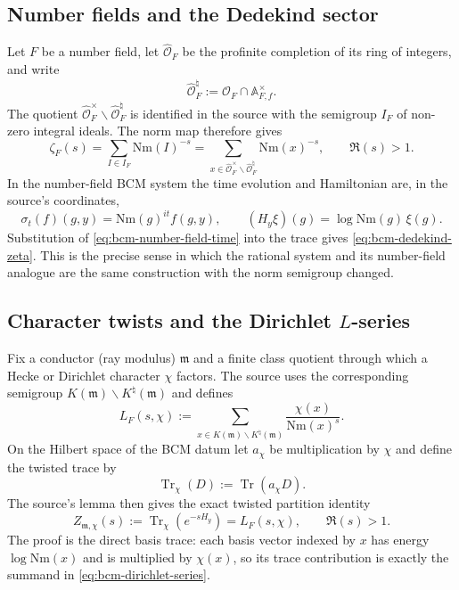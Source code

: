 \subsection{Number fields and the Dedekind sector}

Let $F$ be a number field, let $\widehat{\mathcal O}_F$ be the profinite
completion of its ring of integers, and write
\[
 \widehat{\mathcal O}_F^{\natural}
 :=\widehat{\mathcal O}_F\cap\mathbb A_{F,f}^{\times}.
\]
The quotient $\widehat{\mathcal O}_F^{\times}\backslash
\widehat{\mathcal O}_F^{\natural}$ is identified in the source with the
semigroup $I_F$ of non-zero integral ideals.  The norm map therefore gives
\begin{equation}
 \zeta_F(s)
 =\sum_{I\in I_F}\mathrm{Nm}(I)^{-s}
 =\sum_{x\in\widehat{\mathcal O}_F^{\times}\backslash
       \widehat{\mathcal O}_F^{\natural}}
       \mathrm{Nm}(x)^{-s},
 \qquad \Re(s)>1.
 \label{eq:bcm-dedekind-zeta}
\end{equation}
In the number-field BCM system the time evolution and Hamiltonian are, in the
source's coordinates,
\begin{equation}
 \sigma_t(f)(g,y)=\mathrm{Nm}(g)^{it}f(g,y),
 \qquad
 (H_y\xi)(g)=\log\mathrm{Nm}(g)\,\xi(g).
 \label{eq:bcm-number-field-time}
\end{equation}
Substitution of \eqref{eq:bcm-number-field-time} into the trace gives
\eqref{eq:bcm-dedekind-zeta}.  This is the precise sense in which the rational
system and its number-field analogue are the same construction with the norm
semigroup changed.

\subsection{Character twists and the Dirichlet $L$-series}

Fix a conductor (ray modulus) $\mathfrak m$ and a finite class quotient
through which a Hecke or Dirichlet character $\chi$ factors.  The source uses
the corresponding semigroup $K(\mathfrak m)\backslash
K^{\natural}(\mathfrak m)$ and defines
\begin{equation}
 L_F(s,\chi)
 :=\sum_{x\in K(\mathfrak m)\backslash K^{\natural}(\mathfrak m)}
       \frac{\chi(x)}{\mathrm{Nm}(x)^s}.
 \label{eq:bcm-dirichlet-series}
\end{equation}
On the Hilbert space of the BCM datum let $a_\chi$ be multiplication by
$\chi$ and define the twisted trace by
\[
 \operatorname{Tr}_{\chi}(D):=\operatorname{Tr}(a_\chi D).
\]
The source's lemma then gives the exact twisted partition identity
\begin{equation}
 Z_{\mathfrak m,\chi}(s)
 :=\operatorname{Tr}_{\chi}(e^{-sH_y})
 =L_F(s,\chi),
 \qquad \Re(s)>1.
 \label{eq:bcm-twisted-partition}
\end{equation}
The proof is the direct basis trace: each basis vector indexed by $x$ has
energy $\log\mathrm{Nm}(x)$ and is multiplied by $\chi(x)$, so its trace
contribution is exactly the summand in \eqref{eq:bcm-dirichlet-series}.

